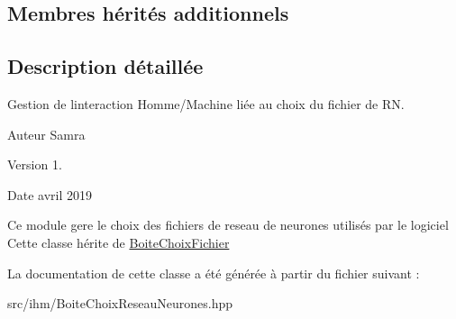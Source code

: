 \subsection*{Membres hérités additionnels}


\subsection{Description détaillée}
Gestion de l\textquotesingle{}interaction Homme/\+Machine liée au choix du fichier de RN. 

\begin{DoxyAuthor}{Auteur}
Samra 
\end{DoxyAuthor}
\begin{DoxyVersion}{Version}
1. 
\end{DoxyVersion}
\begin{DoxyDate}{Date}
avril 2019
\end{DoxyDate}
Ce module gere le choix des fichiers de reseau de neurones utilisés par le logiciel Cette classe hérite de \hyperlink{classBoiteChoixFichier}{Boite\+Choix\+Fichier} 

La documentation de cette classe a été générée à partir du fichier suivant \+:\begin{DoxyCompactItemize}
\item 
src/ihm/Boite\+Choix\+Reseau\+Neurones.\+hpp\end{DoxyCompactItemize}
